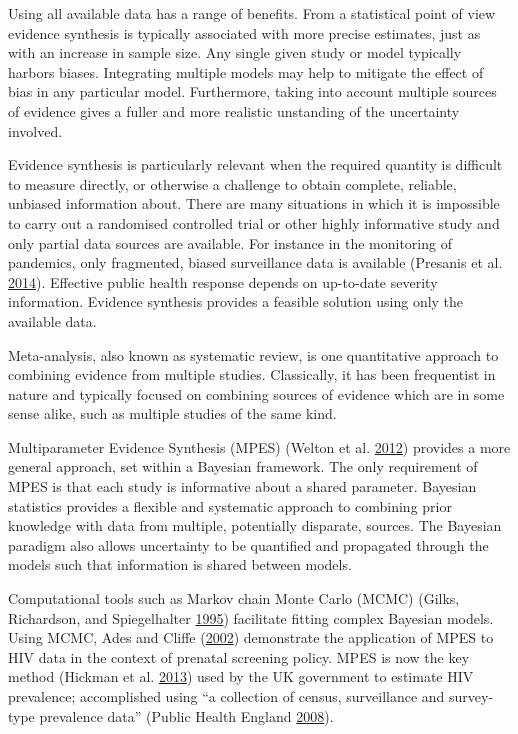 \documentclass[11pt,]{book}
\begin{document}
Using all available data has a range of benefits. From a statistical
point of view evidence synthesis is typically associated with more
precise estimates, just as with an increase in sample size. Any single
given study or model typically harbors biases. Integrating multiple
models may help to mitigate the effect of bias in any particular model.
Furthermore, taking into account multiple sources of evidence gives a
fuller and more realistic unstanding of the uncertainty involved.

Evidence synthesis is particularly relevant when the required quantity
is difficult to measure directly, or otherwise a challenge to obtain
complete, reliable, unbiased information about. There are many
situations in which it is impossible to carry out a randomised
controlled trial or other highly informative study and only partial data
sources are available. For instance in the monitoring of pandemics, only
fragmented, biased surveillance data is available (Presanis et al.
\protect\hyperlink{ref-presanis2014synthesising}{2014}). Effective
public health response depends on up-to-date severity information.
Evidence synthesis provides a feasible solution using only the available
data.

Meta-analysis, also known as systematic review, is one quantitative
approach to combining evidence from multiple studies. Classically, it
has been frequentist in nature and typically focused on combining
sources of evidence which are in some sense alike, such as multiple
studies of the same kind.

Multiparameter Evidence Synthesis (MPES) (Welton et al.
\protect\hyperlink{ref-welton2012evidence}{2012}) provides a more
general approach, set within a Bayesian framework. The only requirement
of MPES is that each study is informative about a shared parameter.
Bayesian statistics provides a flexible and systematic approach to
combining prior knowledge with data from multiple, potentially
disparate, sources. The Bayesian paradigm also allows uncertainty to be
quantified and propagated through the models such that information is
shared between models.

Computational tools such as Markov chain Monte Carlo (MCMC) (Gilks,
Richardson, and Spiegelhalter
\protect\hyperlink{ref-gilks1995markov}{1995}) facilitate fitting
complex Bayesian models. Using MCMC, Ades and Cliffe
(\protect\hyperlink{ref-ades2002markov}{2002}) demonstrate the
application of MPES to HIV data in the context of prenatal screening
policy. MPES is now the key method (Hickman et al.
\protect\hyperlink{ref-hickman2013multiple}{2013}) used by the UK
government to estimate HIV prevalence; accomplished using ``a collection
of census, surveillance and survey-type prevalence data'' (Public Health
England \protect\hyperlink{ref-phe}{2008}).
\end{document}
